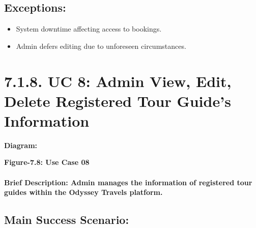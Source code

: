 \documentclass{scrreprt}
\begin{document}
\subsection*{\textbf{Exceptions:}}

\begin{itemize}
    \item System downtime affecting access to bookings.
    \item Admin defers editing due to unforeseen circumstances.
\end{itemize}

\section*{\textbf{7.1.8. UC 8: Admin View, Edit, Delete Registered Tour Guide's Information}}
\textbf{Diagram:}
\newline

\begin{center}
    \parbox{0.8\textwidth}{ 
        \centering
    }
\end{center}
\begin{center}
    \parbox{0.8\textwidth}{ 
        \centering
        \textbf{Figure-7.8: Use Case 08}
    }
\end{center}

\paragraph {\textnormal{Brief Description: 
Admin manages the information of registered tour guides within the Odyssey Travels platform.}}

\subsection*{\textbf{Main Success Scenario:}}
\end{document}
